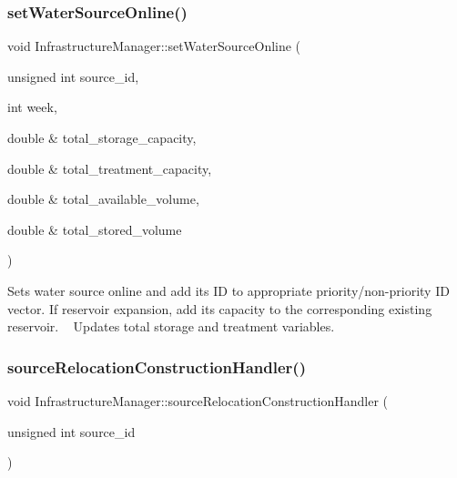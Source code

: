 \subsubsection{\texorpdfstring{set\+Water\+Source\+Online()}{setWaterSourceOnline()}}
{\footnotesize\ttfamily void Infrastructure\+Manager\+::set\+Water\+Source\+Online (\begin{DoxyParamCaption}\item[{unsigned int}]{source\+\_\+id,  }\item[{int}]{week,  }\item[{double \&}]{total\+\_\+storage\+\_\+capacity,  }\item[{double \&}]{total\+\_\+treatment\+\_\+capacity,  }\item[{double \&}]{total\+\_\+available\+\_\+volume,  }\item[{double \&}]{total\+\_\+stored\+\_\+volume }\end{DoxyParamCaption})}

Sets water source online and add its ID to appropriate priority/non-\/priority ID vector. If reservoir expansion, add its capacity to the corresponding existing reservoir. ~\newline
 Updates total storage and treatment variables. \mbox{\label{classInfrastructureManager_a1eb260820a0127294d18d160cb146db9_a1eb260820a0127294d18d160cb146db9}} 
\subsubsection{\texorpdfstring{source\+Relocation\+Construction\+Handler()}{sourceRelocationConstructionHandler()}}
{\footnotesize\ttfamily void Infrastructure\+Manager\+::source\+Relocation\+Construction\+Handler (\begin{DoxyParamCaption}\item[{unsigned int}]{source\+\_\+id }\end{DoxyParamCaption})}

\mbox{\label{classInfrastructureManager_ad40c7049e76f7d097f1dd066c84d5c79_ad40c7049e76f7d097f1dd066c84d5c79}} 
